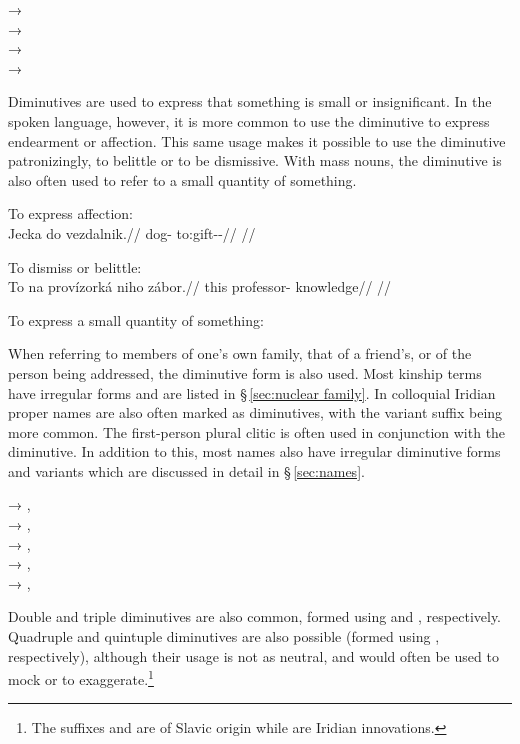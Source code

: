 \ex
{} → \\
 →  \\
 →  \\
 →  
\xe

Diminutives are used to express that something is small or insignificant. In the
spoken language, however, it is more common to use the
diminutive to express endearment or affection. This same usage
makes it possible to use the diminutive patronizingly, to belittle or to be
dismissive. With mass nouns, the diminutive is also often used
to refer to a small quantity of something.

\pex
\a To express affection:\\
\begingl
\gla Jecka do vezdalnik.//
\glb dog-  to:gift-\Pv{}-\Pf{}//
\glft {}//
\endgl

\a To dismiss or belittle:\\
\begingl
\gla To na provízorká niho zábor.//
\glb this \Loc{} professor-  knowledge//
\glft {}//
\endgl

\a To express a small quantity of something:
\xe

When referring to members of one's own family, that of a friend's, or of the person being addressed, the diminutive form is also used. Most kinship terms have irregular forms and are listed in \S\,\ref{sec:nuclear family}. In colloquial Iridian proper names are also often marked as diminutives, with the variant suffix  being more common. The first-person plural clitic  is often used in conjunction with the diminutive. In addition to this, most names also have irregular diminutive forms and variants which are discussed in detail in \S\,\ref{sec:names}.

\ex
{} → , \\
 → , \\
 → , \\
 → , \\
 → , 
\xe

Double and triple diminutives are also common, formed using  and , respectively. Quadruple and quintuple diminutives are also possible (formed using  , respectively), although their usage is not as neutral, and would often be used to mock or to exaggerate.\footnote{The suffixes  and  are of Slavic origin while   are Iridian innovations.}

